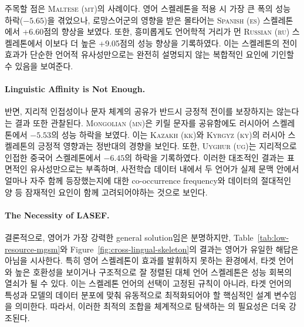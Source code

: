 
주목할 점은 \textsc{Maltese (mt)}의 사례이다. 영어 스켈레톤을 적용 시 가장 큰 폭의 성능 하락($-5.65$)을 겪었으나, 로망스어군의 영향을 받은 몰타어는 \textsc{Spanish (es)} 스켈레톤에서 +6.60점의 향상을 보였다. 또한, 흥미롭게도 언어학적 거리가 먼 \textsc{Russian (ru)} 스켈레톤에서 이보다 더 높은 +9.05점의 성능 향상을 기록하였다. 이는 스켈레톤의 전이 효과가 단순한 언어적 유사성만으로는 완전히 설명되지 않는 복합적인 요인에 기인할 수 있음을 보여준다.

\paragraph{Linguistic Affinity is Not Enough.}
반면, 지리적 인접성이나 문자 체계의 공유가 반드시 긍정적 전이를 보장하지는 않는다는 결과 또한 관찰된다. \textsc{Mongolian (mn)}은 키릴 문자를 공유함에도 러시아어 스켈레톤에서 $-5.53$의 성능 하락을 보였다. 이는 \textsc{Kazakh (kk)}와 \textsc{Kyrgyz (ky)}의 러시아 스켈레톤의 긍정적 영향과는 정반대의 경향을 보인다. 또한, \textsc{Uyghur (ug)}는 지리적으로 인접한 중국어 스켈레톤에서 $-6.45$의 하락을 기록하였다. 이러한 대조적인 결과는 표면적인 유사성만으로는 부족하며, 사전학습 데이터 내에서 두 언어가 실제 문맥 안에서 얼마나 자주 함께 등장했는지에 대한 co-occurrence frequency와 데이터의 절대적인 양 등 잠재적인 요인이 함께 고려되어야하는 것으로 보인다.


\paragraph{The Necessity of LASEF.}
결론적으로, 영어가 가장 강력한 general solution임은 분명하지만, Table~\ref{tab:low-resource-mgsm}와 Figure~\ref{fig:cross-lingual-skeleton}의 결과는 영어가 유일한 해답은 아님을 시사한다. 특히 영어 스켈레톤이 효과를 발휘하지 못하는 환경에서, 타겟 언어와 높은 호환성을 보이거나 구조적으로 잘 정렬된 대체 언어 스켈레톤은 성능 회복의 열쇠가 될 수 있다. 이는 스켈레톤 언어의 선택이 고정된 규칙이 아니라, 타겟 언어의 특성과 모델의 데이터 분포에 맞춰 유동적으로 최적화되어야 할 핵심적인 설계 변수임을 의미한다. 따라서, 이러한 최적의 조합을 체계적으로 탐색하는 \LASEF 의 필요성은 더욱 강조된다.

